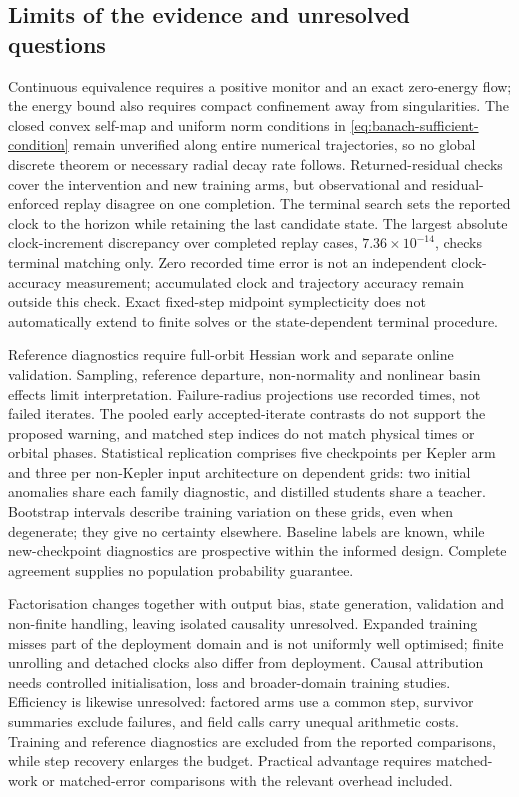 \documentclass[final,3p,times]{elsarticle}
\begin{document}
\subsection{Limits of the evidence and unresolved questions}
\label{sec:evidence-limits}

Continuous equivalence requires a positive monitor and an exact
zero-energy flow; the energy bound also requires compact confinement away
from singularities. The closed convex self-map and uniform norm conditions
in \eqref{eq:banach-sufficient-condition} remain unverified along entire
numerical trajectories, so no global discrete theorem or necessary radial
decay rate follows. Returned-residual checks cover the intervention and
new training arms, but observational and residual-enforced replay disagree
on one completion. The terminal search sets the reported clock to the
horizon while retaining the last candidate state. The largest absolute
clock-increment discrepancy over completed replay cases,
$7.36\times10^{-14}$, checks terminal matching only. Zero recorded time
error is not an independent clock-accuracy measurement; accumulated clock
and trajectory accuracy remain outside this check. Exact fixed-step
midpoint symplecticity does not automatically extend to finite solves or
the state-dependent terminal procedure.

Reference diagnostics require full-orbit Hessian work and separate online
validation. Sampling, reference departure, non-normality and nonlinear
basin effects limit interpretation. Failure-radius projections use
recorded times, not failed iterates. The pooled early accepted-iterate
contrasts do not support the proposed warning, and matched step indices
do not match physical times or orbital phases. Statistical replication
comprises five checkpoints per Kepler arm and three per non-Kepler input
architecture on dependent grids: two initial anomalies share each family
diagnostic, and distilled students share a teacher. Bootstrap intervals
describe training variation on these grids, even when degenerate; they
give no certainty elsewhere. Baseline labels are known, while new-checkpoint
diagnostics are prospective within the informed design. Complete agreement
supplies no population probability guarantee.

Factorisation changes together with output bias, state generation,
validation and non-finite handling, leaving isolated causality unresolved.
Expanded training misses part of the deployment domain and is not
uniformly well optimised; finite unrolling and detached clocks also differ
from deployment. Causal attribution needs controlled initialisation, loss
and broader-domain training studies. Efficiency is likewise unresolved:
factored arms use a common step, survivor summaries exclude failures, and
field calls carry unequal arithmetic costs. Training and reference
diagnostics are excluded from the reported comparisons, while step recovery
enlarges the budget. Practical advantage requires matched-work or
matched-error comparisons with the relevant overhead included.
\end{document}
